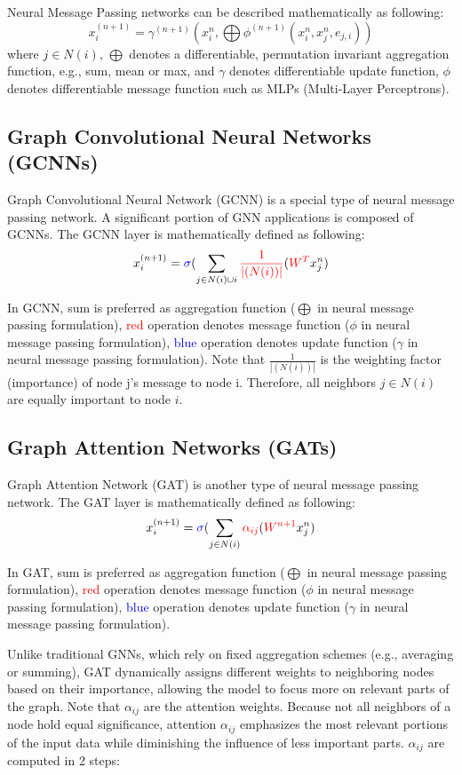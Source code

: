 Neural Message Passing networks can be described mathematically as following: $$x_i^{(n+1)} = \gamma^{(n+1)}(x_i^n, \bigoplus \phi^{(n+1)}(x_i^n, x_j^n, e_{j,i}))$$
where $j \in N(i)$, $\bigoplus$ denotes a differentiable, permutation invariant aggregation function, e.g., sum, mean or max, and $\gamma$ denotes differentiable update function, $\phi$ denotes differentiable message function such as MLPs (Multi-Layer Perceptrons).


\subsection{Graph Convolutional Neural Networks (GCNNs)}\label{subsec:graph-convolutional-neural-networks-(gcnns)}
Graph Convolutional Neural Network (GCNN) is a special type of neural message passing network.
A significant portion of GNN applications is composed of GCNNs. The GCNN layer is mathematically defined as following: $$x_i^{(n+1)} = \textcolor{blue}{\sigma}(\sum_{j \in N(i) \cup {i}} \textcolor{red}{\frac{1}{|(N(i))|}}(\textcolor{red}{W^T}x_j^n)$$


In GCNN, sum is preferred as aggregation function ($\bigoplus$ in neural message passing formulation), \textcolor{red}{red} operation denotes message function ($\phi$ in neural message passing formulation), \textcolor{blue}{blue} operation denotes update function ($\gamma$ in neural message passing formulation).
Note that $\frac{1}{|(N(i))|}$ is the weighting factor (importance) of node j’s message to node i.
Therefore, all neighbors $j \in N(i)$ are equally important to node $i$.


\subsection{Graph Attention Networks (GATs)}\label{subsec:graph-attention-networks-(gats)}
Graph Attention Network (GAT) is another type of neural message passing network. The GAT layer is mathematically defined as following: $$x_i^{(n+1)} = \textcolor{blue}{\sigma}(\sum_{j \in N(i)} \textcolor{red}{\alpha_{ij}}(\textcolor{red}{W^{n+1}}x_j^n)$$


In GAT, sum is preferred as aggregation function ($\bigoplus$ in neural message passing formulation), \textcolor{red}{red} operation denotes message function ($\phi$  in neural message passing formulation), \textcolor{blue}{blue} operation denotes update function ($\gamma$ in neural message passing formulation).

Unlike traditional GNNs, which rely on fixed aggregation schemes (e.g., averaging or summing), GAT dynamically assigns different weights to neighboring nodes based on their importance, allowing the model to focus more on relevant parts of the graph.
Note that $\alpha_{ij}$ are the attention weights.
Because not all neighbors of a node hold equal significance, attention $\alpha_{ij}$ emphasizes the most relevant portions of the input data while diminishing the influence of less important parts. $\alpha_{ij}$ are computed in 2 steps:



